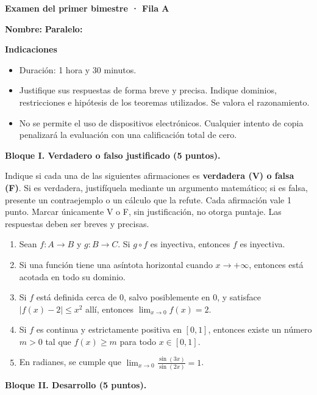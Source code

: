 \documentclass[10pt,a5paper]{article}
\begin{document}
\begin{center}
  {\color{Azul}\large\bfseries Examen del primer bimestre · Fila A}
\end{center}
\noindent\textbf{Nombre:} \hrulefill\quad\textbf{Paralelo:} \makebox[15mm]{\hrulefill}
\medskip

\noindent\textbf{Indicaciones}
\begin{itemize}
  \item Duración: 1 hora y 30 minutos.
  \item Justifique sus respuestas de forma breve y precisa. Indique dominios, restricciones e hipótesis de los teoremas utilizados. Se valora el razonamiento.
  \item No se permite el uso de dispositivos electrónicos. Cualquier intento de copia penalizará la evaluación con una calificación total de cero.
\end{itemize}

\noindent\textbf{Bloque I. Verdadero o falso justificado (5 puntos).}

\smallskip
\noindent Indique si cada una de las siguientes afirmaciones es \textbf{verdadera (V) o falsa (F)}. Si es verdadera, justifíquela mediante un argumento matemático; si es falsa, presente un contraejemplo o un cálculo que la refute. Cada afirmación vale 1 punto. Marcar únicamente V o F, sin justificación, no otorga puntaje. Las respuestas deben ser breves y precisas.
\begin{enumerate}
  \item Sean $f\colon A\to B$ y $g\colon B\to C$. Si $g\circ f$ es inyectiva, entonces $f$ es inyectiva.
  \item Si una función tiene una asíntota horizontal cuando $x\to+\infty$, entonces está acotada en todo su dominio.
  \item Si $f$ está definida cerca de $0$, salvo posiblemente en $0$, y satisface $|f(x)-2|\leq x^2$ allí, entonces $\lim_{x\to0}f(x)=2$.
  \item Si $f$ es continua y estrictamente positiva en $[0,1]$, entonces existe un número $m>0$ tal que $f(x)\geq m$ para todo $x\in[0,1]$.
  \item En radianes, se cumple que $\displaystyle\lim_{x\to0}\frac{\sin(3x)}{\sin(2x)}=1$.
\end{enumerate}

\medskip
\noindent\textbf{Bloque II. Desarrollo (5 puntos).}
\end{document}
